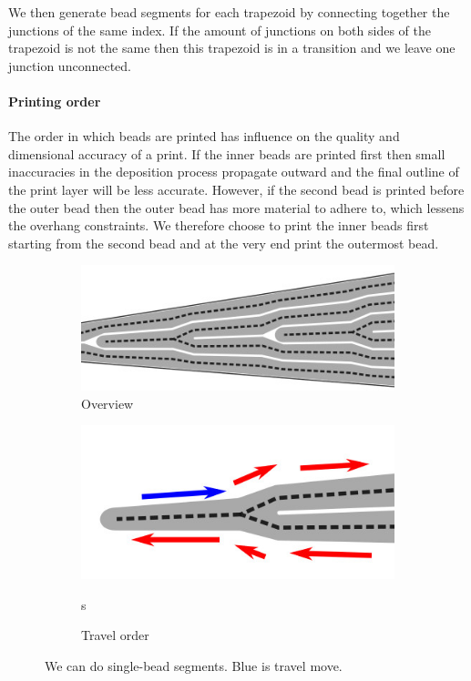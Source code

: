 We then generate bead segments for each trapezoid by connecting together the junctions of the same index.
If the amount of junctions on both sides of the trapezoid is not the same then this trapezoid is in a transition and we leave one junction unconnected.


\paragraph{Printing order}
The order in which beads are printed has influence on the quality and dimensional accuracy of a print.
If the inner beads are printed first then small inaccuracies in the deposition process propagate outward and the final outline of the print layer will be less accurate.
However, if the second bead is printed before the outer bead then the outer bead has more material to adhere to, which lessens the overhang constraints.
We therefore choose to print the inner beads first starting from the second bead and at the very end print the outermost bead.



\begin{figure}
\begin{subfigure}{0.45\columnwidth}
\includegraphics[width=\columnwidth]{sources/method/single_bead_strategy.jpg}
\caption{Overview}
\label{single_bead_strategy_overview}
\end{subfigure}
\begin{subfigure}{0.45\columnwidth}
\includegraphics[width=\columnwidth]{sources/method/single_bead_strategy_order.jpg}
\caption{Travel order}s
\end{subfigure}
\caption{We can do single-bead segments. Blue is travel move.}
\label{single_bead_strategy}
\end{figure}

